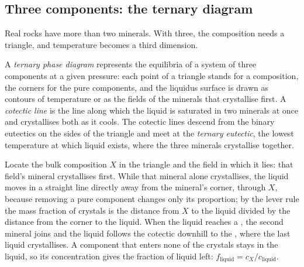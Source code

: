 \subsection*{Three components: the ternary diagram}

Real rocks have more than two minerals. With three, the composition needs a
triangle, and temperature becomes a third dimension.

\begin{definition}\label{def:b2:mantle-melting:ternary}
A \emph{ternary phase diagram} represents the
equilibria of a system of three components at a given pressure: each point of a
triangle stands for a composition, the corners for the pure components, and the
liquidus surface is drawn as contours of temperature or as the fields of the
minerals that crystallise first. A \emph{cotectic line} is
the line along which the liquid is saturated in two minerals at once and
crystallises both as it cools. The cotectic lines descend from the binary
eutectics on the sides of the triangle and meet at the \emph{ternary
eutectic}, the lowest temperature at which liquid exists,
where the three minerals crystallise together.
\end{definition}

\begin{method}\label{met:b2:mantle-melting:ternary}
Locate the bulk composition $X$ in the triangle and the field in which it lies:
that field's mineral crystallises first. While that mineral alone crystallises,
the liquid moves in a straight line directly away from the mineral's corner,
through $X$, because removing a pure component changes only its proportion; by the
lever rule the mass fraction of crystals is the distance from $X$ to the liquid
divided by the distance from the corner to the liquid. When the liquid reaches a
, the second mineral joins and the liquid follows the cotectic
downhill to the , where the last liquid crystallises. A component
that enters none of the crystals stays in the liquid, so its concentration gives
the fraction of liquid left: $f_{\text{liquid}} = c_X/c_{\text{liquid}}$.
\end{method}

